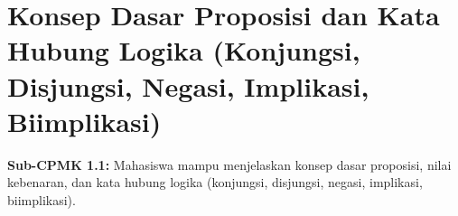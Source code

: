 \documentclass[../main]{subfiles}
\begin{document}
\chapter{Konsep Dasar Proposisi dan Kata Hubung Logika (Konjungsi, Disjungsi, Negasi, Implikasi, Biimplikasi)}

\begin{subcpmk}
  \item \textbf{Sub-CPMK 1.1:} Mahasiswa mampu menjelaskan konsep dasar proposisi, nilai kebenaran, dan kata hubung logika (konjungsi, disjungsi, negasi, implikasi, biimplikasi).
\end{subcpmk}








\end{document}
